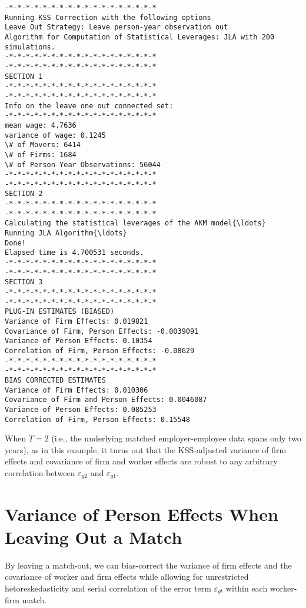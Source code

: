 \documentclass[11pt]{article}
\begin{document}
    \begin{Verbatim}[commandchars=\\\{\}]
-*-*-*-*-*-*-*-*-*-*-*-*-*-*-*-*-*-*
Running KSS Correction with the following options
Leave Out Strategy: Leave person-year observation out
Algorithm for Computation of Statistical Leverages: JLA with 200 simulations.
-*-*-*-*-*-*-*-*-*-*-*-*-*-*-*-*-*-*
-*-*-*-*-*-*-*-*-*-*-*-*-*-*-*-*-*-*
SECTION 1
-*-*-*-*-*-*-*-*-*-*-*-*-*-*-*-*-*-*
-*-*-*-*-*-*-*-*-*-*-*-*-*-*-*-*-*-*
Info on the leave one out connected set:
-*-*-*-*-*-*-*-*-*-*-*-*-*-*-*-*-*-*
mean wage: 4.7636
variance of wage: 0.1245
\# of Movers: 6414
\# of Firms: 1684
\# of Person Year Observations: 56044
-*-*-*-*-*-*-*-*-*-*-*-*-*-*-*-*-*-*
-*-*-*-*-*-*-*-*-*-*-*-*-*-*-*-*-*-*
SECTION 2
-*-*-*-*-*-*-*-*-*-*-*-*-*-*-*-*-*-*
-*-*-*-*-*-*-*-*-*-*-*-*-*-*-*-*-*-*
Calculating the statistical leverages of the AKM model{\ldots}
Running JLA Algorithm{\ldots}
Done!
Elapsed time is 4.700531 seconds.
-*-*-*-*-*-*-*-*-*-*-*-*-*-*-*-*-*-*
-*-*-*-*-*-*-*-*-*-*-*-*-*-*-*-*-*-*
SECTION 3
-*-*-*-*-*-*-*-*-*-*-*-*-*-*-*-*-*-*
-*-*-*-*-*-*-*-*-*-*-*-*-*-*-*-*-*-*
PLUG-IN ESTIMATES (BIASED)
Variance of Firm Effects: 0.019821
Covariance of Firm, Person Effects: -0.0039091
Variance of Person Effects: 0.10354
Correlation of Firm, Person Effects: -0.08629
-*-*-*-*-*-*-*-*-*-*-*-*-*-*-*-*-*-*
-*-*-*-*-*-*-*-*-*-*-*-*-*-*-*-*-*-*
BIAS CORRECTED ESTIMATES
Variance of Firm Effects: 0.010306
Covariance of Firm and Person Effects: 0.0046087
Variance of Person Effects: 0.085253
Correlation of Firm, Person Effects: 0.15548
    \end{Verbatim}

    When \(T=2\) (i.e., the underlying matched employer-employee data spans
only two years), as in this example, it turns out that the KSS-adjusted
variance of firm effects and covariance of firm and worker effects are
robust to any arbitrary correlation between \(\varepsilon_{g2}\) and
\(\varepsilon_{g1}\).

    \hypertarget{variance-of-person-effects-when-leaving-out-a-match}{%
\section{Variance of Person Effects When Leaving Out a
Match}\label{sec:var_pe}}

By leaving a match-out, we can bias-correct the variance of firm
effects and the covariance of worker and firm effects while allowing for
unrestricted hetoreskedasticity and serial correlation of the error term
\(\varepsilon_{gt}\) within each worker-firm match.
\end{document}
